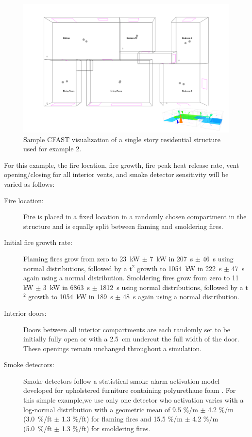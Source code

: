 \documentclass[12pt,twoside]{book}
\begin{document}
\begin{figure}[h!]
\centering
\includegraphics[width=6.5in]{FIGURES/Detectors.png}
\caption{Sample CFAST visualization of a single story residential structure used for example 2.}
\label{detector_geometry}
\end{figure}

For this example, the fire location, fire growth, fire peak heat release rate, vent opening/closing for all interior vents, and smoke detector sensitivity will be varied as follows:

\begin{description}
\item[Fire location:] Fire is placed in a fixed location in a randomly chosen compartment in the structure and is equally split between flaming and smoldering fires.
\item[Initial fire growth rate:] Flaming fires grow from zero to 23~kW $\pm$ 7~kW in 207~s $\pm$ 46~s using normal distributions, followed by a t$^2$ growth to 1054~kW in 222~s $\pm$ 47~s again using a normal distribution. Smoldering fires grow from zero to 11~ kW $\pm$ 3~kW in 6863~s $\pm$ 1812~s using normal distributions, followed by a t$^2$ growth to 1054~kW in 189~s $\pm$ 48~s again using a normal distribution.
\item[Interior doors:] Doors between all interior compartments are each randomly set to be initially fully open or with a 2.5~cm undercut the full width of the door. These openings remain unchanged throughout a simulation.
\item[Smoke detectors:] Smoke detectors follow a statistical smoke alarm activation model developed for upholstered furniture containing polyurethane foam \cite{Cleary:2017}. For this simple example,we use only one detector who activation varies with a log-normal distribution with a geometric mean of 9.5 \%/m $\pm$ 4.2 \%/m (3.0~\%/ft $\pm$ 1.3 \%/ft) for flaming fires and 15.5 \%/m $\pm$ 4.2 \%/m (5.0~\%/ft $\pm$ 1.3 \%/ft) for smoldering fires.
\end{description}
\end{document}
